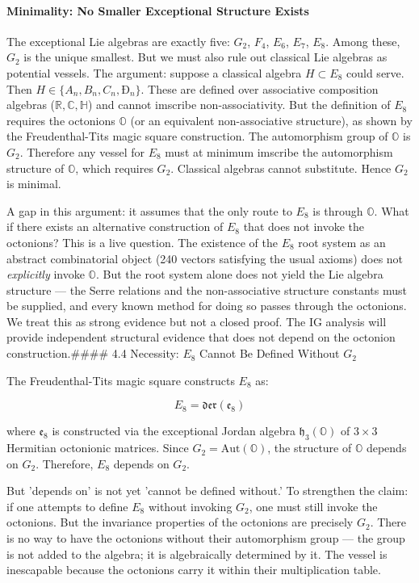 \documentclass[12pt,a4paper]{article}
\begin{document}
\paragraph{Minimality: No Smaller Exceptional Structure Exists}

The exceptional Lie algebras are exactly five: $G_2$, $F_4$, $E_6$, $E_7$, $E_8$. Among these, $G_2$ is the unique smallest. But we must also rule out classical Lie algebras as potential vessels. The argument: suppose a classical algebra $H \subset E_8$ could serve. Then $H \in \{A_n, B_n, C_n, Ð_n\}$. These are defined over associative composition algebras ($\mathbb{R}, \mathbb{C}, \mathbb{H}$) and cannot imscribe non-associativity. But the definition of $E_8$ requires the octonions $\mathbb{O}$ (or an equivalent non-associative structure), as shown by the Freudenthal-Tits magic square construction. The automorphism group of $\mathbb{O}$ is $G_2$. Therefore any vessel for $E_8$ must at minimum imscribe the automorphism structure of $\mathbb{O}$, which requires $G_2$. Classical algebras cannot substitute. Hence $G_2$ is minimal.

A gap in this argument: it assumes that the only route to $E_8$ is through $\mathbb{O}$. What if there exists an alternative construction of $E_8$ that does not invoke the octonions? This is a live question. The existence of the $E_8$ root system as an abstract combinatorial object (240 vectors satisfying the usual axioms) does not \emph{explicitly} invoke $\mathbb{O}$. But the root system alone does not yield the Lie algebra structure --- the Serre relations and the non-associative structure constants must be supplied, and every known method for doing so passes through the octonions. We treat this as strong evidence but not a closed proof. The IG analysis will provide independent structural evidence that does not depend on the octonion construction.\#\#\#\# 4.4 Necessity: $E_8$ Cannot Be Defined Without $G_2$

The Freudenthal-Tits magic square constructs $E_8$ as:

\[E_8 = \mathfrak{der}(\mathfrak{e}_8)\]

where $\mathfrak{e}_8$ is constructed via the exceptional Jordan algebra $\mathfrak{h}_3(\mathbb{O})$ of $3 \times 3$ Hermitian octonionic matrices. Since $G_2 = \text{Aut}(\mathbb{O})$, the structure of $\mathbb{O}$ depends on $G_2$. Therefore, $E_8$ depends on $G_2$.

But 'depends on' is not yet 'cannot be defined without.' To strengthen the claim: if one attempts to define $E_8$ without invoking $G_2$, one must still invoke the octonions. But the invariance properties of the octonions are precisely $G_2$. There is no way to have the octonions without their automorphism group --- the group is not added to the algebra; it is algebraically determined by it. The vessel is inescapable because the octonions carry it within their multiplication table.
\end{document}
